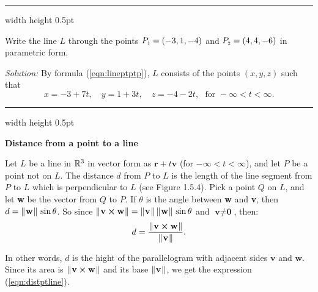 \medskip
\hrule width \textwidth height 0.5pt
\begin{exmp}\label{exmp:linethrupts}
 Write the line $L$ through the points $P_{\scriptscriptstyle 1} = (-3,1,-4)$ and $P_{\scriptscriptstyle 2} = (4,4,-6)$ in parametric
 form.\smallskip
 \par\noindent\emph{Solution:} By formula (\ref{eqn:lineptptp}), $L$ consists of the points $(x,y,z)$ such that
 \begin{displaymath}
  x = -3 + 7t, \quad y = 1 +3t, \quad z = -4 -2t, \text{~~for~} -\infty < t < \infty.
 \end{displaymath}
\end{exmp}
\hrule width \textwidth height 0.5pt
\medskip

\par\noindent\textbf{\large{Distance from a point to a line}}
\normalsize
\smallskip


\piccaption[]{}
Let $L$ be a line in $\mathbb{R}^{3}$ in vector form as $\textbf{r} + t \textbf{v}$ (for $-\infty < t < \infty$), and
let $P$ be a point not on $L$. 
The distance $d$ from $P$ to $L$ is the length
of the line segment from $P$ to $L$ which is perpendicular to $L$ (see Figure 1.5.4).
Pick a point $Q$ on $L$, and let \textbf{w} be the vector from $Q$ to $P$. 
If $\theta$ is the angle between \textbf{w}
and \textbf{v}, then $d = \lVert\mspace{1mu}\textbf{w}\mspace{1mu}\rVert\,\sin \theta$. So since
$\lVert\mspace{1mu}\textbf{v} \bm{\times} \textbf{w}\mspace{1mu}\rVert = \lVert\mspace{1mu}\textbf{v}\mspace{1mu}\rVert\,\lVert\mspace{1mu}\textbf{w}\mspace{1mu}\rVert\,\sin \theta$ and
$\textbf{v} \ne \textbf{0}$, then:
\begin{equation}\label{eqn:distptline}
 d = \frac{\lVert\mspace{1mu}\textbf{v} \bm{\times} \textbf{w}\mspace{1mu}\rVert}{\lVert\mspace{1mu}\textbf{v}\mspace{1mu}\rVert}.
\end{equation}

In other words, $d$ is the hight of the parallelogram with adjacent sides $\textbf{v}$ and $\textbf{w}$.
Since its area is $\lVert\mspace{1mu}\textbf{v} \bm{\times} \textbf{w}\mspace{1mu}\rVert$ 
and its base $\lVert\mspace{1mu}\textbf{v}\mspace{1mu}\rVert$, we get the expression (\ref{eqn:distptline}).

